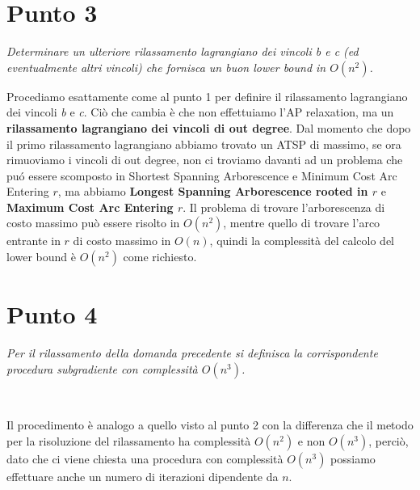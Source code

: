 \documentclass[11pt]{book}
\begin{document}
\section*{Punto 3}

\textit{Determinare un ulteriore rilassamento lagrangiano dei vincoli b e c
(ed eventualmente altri vincoli) che fornisca un buon lower bound in
$O(n^2)$.
}
\

Procediamo esattamente come al punto 1 per definire il rilassamento
lagrangiano dei vincoli \textit{b} e \textit{c}. Ci\`o che cambia \`e
che non effettuiamo l'AP relaxation, ma un \textbf{rilassamento
  lagrangiano dei vincoli di out degree}. Dal momento che dopo il
primo rilassamento lagrangiano abbiamo trovato un ATSP di massimo, se
ora rimuoviamo i vincoli di out degree, non ci troviamo davanti ad un
problema che pu\'o essere scomposto in Shortest Spanning Arborescence
e Minimum Cost Arc Entering $r$, ma abbiamo \textbf{Longest Spanning
  Arborescence rooted in $r$} e \textbf{Maximum Cost Arc Entering
  $r$}. Il problema di trovare l'arborescenza di costo massimo pu\`o
essere risolto in $O(n^2)$, mentre quello di trovare l'arco entrante
in $r$ di costo massimo in $O(n)$, quindi la complessit\`a del calcolo
del lower bound \`e $O(n^2)$ come richiesto.

\section*{Punto 4}

\textit{Per il rilassamento della domanda precedente si definisca la
  corrispondente procedura subgradiente con complessit\`a $O(n^3)$.}

\

Il procedimento \`e analogo a quello visto al punto 2 con la
differenza che il metodo per la risoluzione del rilassamento ha
complessit\`a $O(n^2)$ e non $O(n^3)$, perci\`o, dato che ci viene
chiesta una procedura con complessit\`a $O(n^3)$ possiamo effettuare
anche un numero di iterazioni dipendente da $n$.
\end{document}

